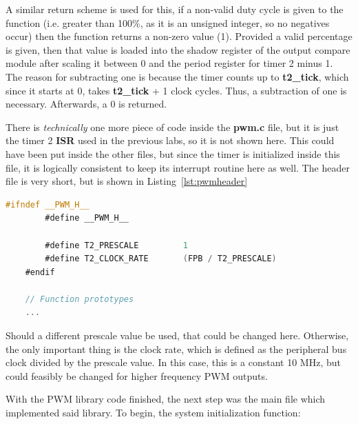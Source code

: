\documentclass[a4paper, 12pt]{article}
\begin{document}
A similar return scheme is used for this, if a non-valid duty cycle is given to the function (i.e. greater than 100\%, as it is an unsigned integer, so no negatives occur) then the function returns a non-zero value (1). Provided a valid percentage is given, then that value is loaded into the shadow register of the output compare module after scaling it between 0 and the period register for timer 2 minus 1. The reason for subtracting one is because the timer counts up to \textbf{t2\_tick}, which since it starts at 0, takes \textbf{t2\_tick} + 1 clock cycles. Thus, a subtraction of one is necessary. Afterwards, a 0 is returned.

There is \textit{technically} one more piece of code inside the \textbf{pwm.c} file, but it is just the timer 2 \textbf{ISR} used in the previous labs, so it is not shown here. This could have been put inside the other files, but since the timer is initialized inside this file, it is logically consistent to keep its interrupt routine here as well. The header file is very short, but is shown in Listing~\ref{lst:pwmheader}

	\begin{mdframed}[backgroundcolor=code-gray, roundcorner=10pt,
								innerleftmargin=5, innertopmargin=5, innerbottommargin=5]	
	\begin{lstlisting}[language=C, caption=PWM Header File, tabsize=2, label={lst:pwmheader}]
	#ifndef __PWM_H__
		#define __PWM_H__

		#define T2_PRESCALE			1
		#define T2_CLOCK_RATE		(FPB / T2_PRESCALE)
	#endif

	// Function prototypes
	...
	\end{lstlisting}
	\end{mdframed}
	
Should a different prescale value be used, that could be changed here. Otherwise, the only important thing is the clock rate, which is defined as the peripheral bus clock divided by the prescale value. In this case, this is a constant 10 MHz, but could feasibly be changed for higher frequency PWM outputs.

With the PWM library code finished, the next step was the main file which implemented said library. To begin, the system initialization function:
\end{document}
